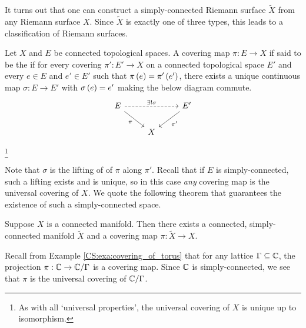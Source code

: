 \documentclass[../Moduli_Spaces_of_Riemann_Surfaces.tex]{subfiles}
\begin{document}
    \begin{remark}
        It turns out that one can construct a simply-connected Riemann surface $\tilde{X}$ from any Riemann surface $X$. Since $\tilde{X}$ is exactly one of three types, this leads to a classification of Riemann surfaces.\exqed
    \end{remark}
    \begin{definition}
        Let $X$ and $E$ be connected topological spaces. A covering map $\pi:E\to X$ if said to be the  if for every covering $\pi':E'\to X$ on a connected topological space $E'$ and every $e\in E$ and $e'\in E'$ such that $\pi\left(e\right)=\pi'\left(e'\right)$, there exists a unique continuous map $\sigma:E\to E'$ with $\sigma\left(e\right)=e'$ making the below diagram commute.
        \begin{equation*}
            \begin{tikzcd}
                E \ar[rr, "\ex!\sigma", dashed] \ar[dr, "\pi"'] & & E' \ar[dl, "\pi'"] \\
                                                    & X
            \end{tikzcd}
        \end{equation*}
    \end{definition}
    \footnote{As with all `universal properties', the universal covering of $X$ is unique up to isomorphism.}
    \vspace{-0.05in}
    \begin{remark}
        Note that $\sigma$ is the lifting of of $\pi$ along $\pi'$. Recall that if $E$ is simply-connected, such a lifting exists and is unique, so in this case \textit{any} covering map is the universal covering of $X$. We quote the following theorem that guarantees the existence of such a simply-connected space.\exqed
    \end{remark}
    \begin{theorem}
        Suppose $X$ is a connected manifold. Then there exists a connected, simply-connected manifold $\tilde{X}$ and a covering map $\pi:\tilde{X}\to X$.
    \end{theorem}
    \begin{example}
        Recall from Example \ref{CS:exa:covering_of_torus} that for any lattice $\Gamma\subseteq\mathbb{C}$, the projection $\pi:\mathbb{C}\to\mathbb{C}/\Gamma$ is a covering map. Since $\mathbb{C}$ is simply-connected, we see that $\pi$ is the universal covering of $\mathbb{C}/\Gamma$.\exqed
    \end{example}
\end{document}

